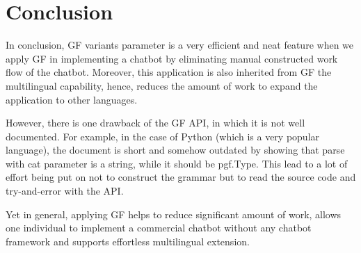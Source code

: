 \documentclass[12pt]{article}
\begin{document}
\section{Conclusion}
In conclusion, GF variants parameter is a very efficient and neat feature when we apply GF in implementing a chatbot by eliminating manual constructed work flow of the chatbot. Moreover, this application is also inherited from GF the multilingual capability, hence, reduces the amount of work to expand the application to other languages.

However, there is one drawback of the GF API, in which it is not well documented. For example, in the case of Python (which is a very popular language), the document is short and somehow outdated by showing that parse with cat parameter is a string, while it should be pgf.Type. This lead to a lot of effort being put on not to construct the grammar but to read the source code and try-and-error with the API.

Yet in general, applying GF helps to reduce significant amount of work, allows one individual to implement a commercial chatbot without any chatbot framework and supports effortless multilingual extension.




\end{document}
